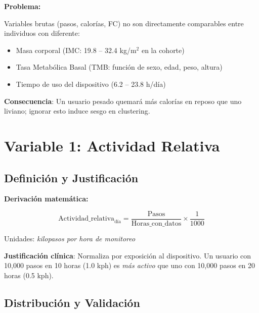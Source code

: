\documentclass[12pt,letterpaper,twoside]{report}
\begin{document}
\begin{hipotesisbox}
\textbf{Problema:}

Variables brutas (pasos, calorías, FC) no son directamente comparables entre individuos con diferente:
\begin{itemize}[noitemsep]
    \item Masa corporal (IMC: 19.8 -- 32.4 kg/m$^2$ en la cohorte)
    \item Tasa Metabólica Basal (TMB: función de sexo, edad, peso, altura)
    \item Tiempo de uso del dispositivo (6.2 -- 23.8 h/día)
\end{itemize}

\textbf{Consecuencia}: Un usuario pesado quemará más calorías en reposo que uno liviano; ignorar esto induce sesgo en clustering.
\end{hipotesisbox}

\section{Variable 1: Actividad Relativa}

\subsection{Definición y Justificación}

\begin{estadisticobox}
\textbf{Derivación matemática:}

\begin{equation}
\text{Actividad\_relativa}_{\text{día}} = \frac{\text{Pasos}}{\text{Horas\_con\_datos}} \times \frac{1}{1000}
\end{equation}

Unidades: \textit{kilopasos por hora de monitoreo}

\textbf{Justificación clínica}: Normaliza por exposición al dispositivo. Un usuario con 10,000 pasos en 10 horas (1.0 kph) es \textit{más activo} que uno con 10,000 pasos en 20 horas (0.5 kph).
\end{estadisticobox}

\subsection{Distribución y Validación}
\end{document}
